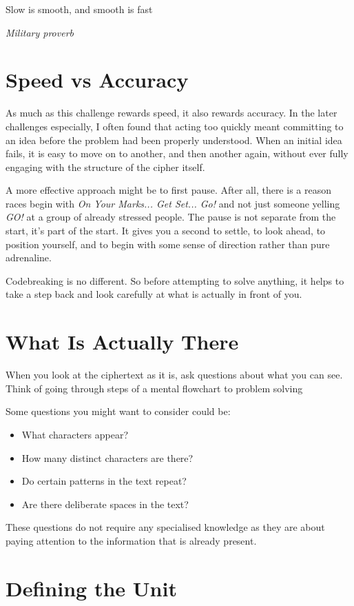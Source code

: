 \epigraph{Slow is smooth, and smooth is fast}
{\textit{Military proverb}}

\section{Speed vs Accuracy}

As much as this challenge rewards speed, it also rewards accuracy. In the later challenges especially, I often found that acting too quickly meant committing to an idea before the problem had been properly understood. When an initial idea fails, it is easy to move on to another, and then another again, without ever fully engaging with the structure of the cipher itself.

A more effective approach might be to first pause. After all, there is a reason races begin with \textit{On Your Marks... Get Set... Go!} and not just someone yelling \textit{GO!} at a group of already stressed people. The pause is not separate from the start, it's part of the start. It gives you a second to settle, to look ahead, to position yourself, and to begin with some sense of direction rather than pure adrenaline.

Codebreaking is no different. So before attempting to solve anything, it helps to take a step back and look carefully at what is actually in front of you. 

\section{What Is Actually There}

When you look at the ciphertext as it is, ask questions about what you can see. Think of going through steps of a mental flowchart to problem solving 

Some questions you might want to consider could be: 
\begin{itemize}
    \item What characters appear? 
    \item How many distinct characters are there? 
    \item Do certain patterns in the text repeat? 
    \item Are there deliberate spaces in the text? 
\end{itemize}

These questions do not require any specialised knowledge as they are about paying attention to the information that is already present.


\section{Defining the Unit}


